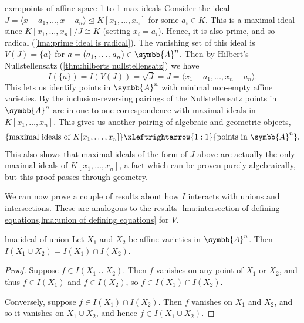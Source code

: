 \documentclass[fleqn]{NotesClass}
\newcommand{\subideal}{\trianglelefteq}
\newcommand{\affine}{\symbb{A}}
\newcommand{\isomorphic}{\cong}
\begin{document}
    \begin{exm}{}{exm:points of affine space 1 to 1 max ideals}
        Consider the ideal \(J = \langle x - a_1, \dotsc, x - a_n \rangle \subideal K[x_1, \dotsc, x_n]\) for some \(a_i \in K\).
        This is a maximal ideal since \(K[x_1, \dotsc, x_n]/J \isomorphic K\) (setting \(x_i = a_i\)).
        Hence, it is also prime, and so radical (\cref{lma:prime ideal is radical}).
        The vanishing set of this ideal is \(V(J) = \{a\}\) for \(a = (a_1, \dotsc, a_n) \in \affine^n\).
        Then by Hilbert's Nullstellensatz (\cref{thm:hilberts nullstellensatz}) we have
        \begin{equation}
            I(\{a\}) = I(V(J)) = \sqrt{J} = J = \langle x_1 - a_1, \dotsc, x_n - a_n \rangle.
        \end{equation}
        This lets us identify points in \(\affine^n\) with minimal non-empty affine varieties.
        By the inclusion-reversing pairings of the Nullstellensatz points in \(\affine^n\) are in one-to-one correspondence with maximal ideals in \(K[x_1, \dotsc, x_n]\).
        This gives us another pairing of algebraic and geometric objects,
        \begin{equation}
            \{\text{maximal ideals of } K[x_1, \dotsc, x_n]\} \xleftrightarrow{1:1} \{\text{points in } \affine^n\}.
        \end{equation}
        This also shows that maximal ideals of the form of \(J\) above are actually the only maximal ideals of \(K[x_1, \dotsc, x_n]\), a fact which can be proven purely algebraically, but this proof passes through geometry.
    \end{exm}
    
    We can now prove a couple of results about how \(I\) interacts with unions and intersections.
    These are analogous to the results \cref{lma:intersection of defining equations,lma:union of defining equations} for \(V\). 
    
    \begin{lma}{}{lma:ideal of union}
        Let \(X_1\) and \(X_2\) be affine varieties in \(\affine^n\).
        Then \(I(X_1 \cup X_2) = I(X_1) \cap I(X_2)\).
        \begin{proof}
            Suppose \(f \in I(X_1 \cup X_2)\).
            Then \(f\) vanishes on any point of \(X_1\) or \(X_2\), and thus \(f \in I(X_1)\) and \(f \in I(X_2)\), so \(f \in I(X_1) \cap I(X_2)\).
            
            Conversely, suppose \(f \in I(X_1) \cap I(X_2)\).
            Then \(f\) vanishes on \(X_1\) and \(X_2\), and so it vanishes on \(X_1 \cup X_2\), and hence \(f \in I(X_1 \cup X_2)\).
        \end{proof}
    \end{lma}
    
\end{document}
